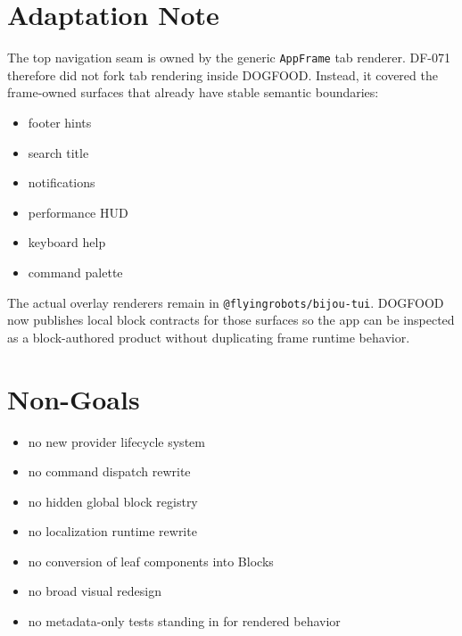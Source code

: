 \section{Adaptation Note}\label{record-111-adaptation-note}

The top navigation seam is owned by the generic \texttt{A\allowbreak{}p\allowbreak{}p\allowbreak{}F\allowbreak{}r\allowbreak{}a\allowbreak{}m\allowbreak{}e} tab renderer. DF-071 therefore did not fork tab rendering inside DOGFOOD. Instead, it covered the frame-owned surfaces that already have stable semantic boundaries:

\begin{itemize}
\tightlist
\item
  footer hints
\item
  search title
\item
  notifications
\item
  performance HUD
\item
  keyboard help
\item
  command palette
\end{itemize}

The actual overlay renderers remain in \texttt{@\allowbreak{}f\allowbreak{}l\allowbreak{}y\allowbreak{}i\allowbreak{}n\allowbreak{}g\allowbreak{}r\allowbreak{}o\allowbreak{}b\allowbreak{}o\allowbreak{}t\allowbreak{}s\allowbreak{}/\allowbreak{}b\allowbreak{}i\allowbreak{}j\allowbreak{}o\allowbreak{}u\allowbreak{}-\allowbreak{}t\allowbreak{}u\allowbreak{}i}. DOGFOOD now publishes local block contracts for those surfaces so the app can be inspected as a block-authored product without duplicating frame runtime behavior.

\section{Non-Goals}\label{record-111-non-goals}

\begin{itemize}
\tightlist
\item
  no new provider lifecycle system
\item
  no command dispatch rewrite
\item
  no hidden global block registry
\item
  no localization runtime rewrite
\item
  no conversion of leaf components into Blocks
\item
  no broad visual redesign
\item
  no metadata-only tests standing in for rendered behavior
\end{itemize}


